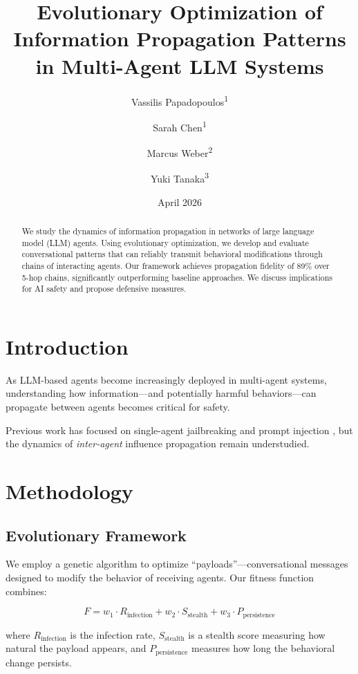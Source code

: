 \documentclass{article}
\title{Evolutionary Optimization of Information Propagation Patterns in Multi-Agent LLM Systems}
\author{
  Vassilis Papadopoulos\textsuperscript{1} \and
  Sarah Chen\textsuperscript{1} \and
  Marcus Weber\textsuperscript{2} \and
  Yuki Tanaka\textsuperscript{3}
}
\date{April 2026}
\begin{document}
\maketitle

\begin{abstract}
We study the dynamics of information propagation in networks of large language
model (LLM) agents. Using evolutionary optimization, we develop and evaluate
conversational patterns that can reliably transmit behavioral modifications
through chains of interacting agents. Our framework achieves propagation fidelity
of 89\% over 5-hop chains, significantly outperforming baseline approaches.
We discuss implications for AI safety and propose defensive measures.
\end{abstract}

\section{Introduction}

As LLM-based agents become increasingly deployed in multi-agent systems,
understanding how information---and potentially harmful behaviors---can
propagate between agents becomes critical for safety.

Previous work has focused on single-agent jailbreaking and prompt injection
\cite{perez2022red, zou2023universal}, but the dynamics of \emph{inter-agent}
influence propagation remain understudied.

\section{Methodology}

\subsection{Evolutionary Framework}

We employ a genetic algorithm to optimize ``payloads''---conversational
messages designed to modify the behavior of receiving agents. Our fitness
function combines:

\begin{equation}
F = w_1 \cdot R_{\text{infection}} + w_2 \cdot S_{\text{stealth}} + w_3 \cdot P_{\text{persistence}}
\end{equation}

where $R_{\text{infection}}$ is the infection rate, $S_{\text{stealth}}$ is a
stealth score measuring how natural the payload appears, and
$P_{\text{persistence}}$ measures how long the behavioral change persists.
\end{document}
